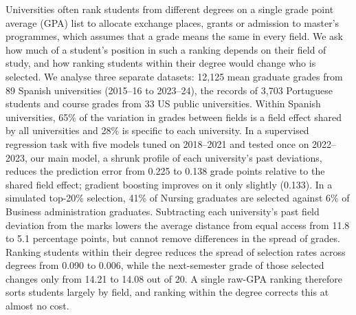 
Universities often rank students from different degrees on a single grade point average (GPA) list to allocate exchange places, grants or admission to master's programmes, which assumes that a grade means the same in every field. We ask how much of a student's position in such a ranking depends on their field of study, and how ranking students within their degree would change who is selected. We analyse three separate datasets: 12,125 mean graduate grades from 89 Spanish universities (2015--16 to 2023--24), the records of 3,703 Portuguese students and course grades from 33 US public universities. Within Spanish universities, 65\% of the variation in grades between fields is a field effect shared by all universities and 28\% is specific to each university. In a supervised regression task with five models tuned on 2018--2021 and tested once on 2022--2023, our main model, a shrunk profile of each university's past deviations, reduces the prediction error from 0.225 to 0.138 grade points relative to the shared field effect; gradient boosting improves on it only slightly (0.133). In a simulated top-20\% selection, 41\% of Nursing graduates are selected against 6\% of Business administration graduates. Subtracting each university's past field deviation from the marks lowers the average distance from equal access from 11.8 to 5.1 percentage points, but cannot remove differences in the spread of grades. Ranking students within their degree reduces the spread of selection rates across degrees from 0.090 to 0.006, while the next-semester grade of those selected changes only from 14.21 to 14.08 out of 20. A single raw-GPA ranking therefore sorts students largely by field, and ranking within the degree corrects this at almost no cost.

